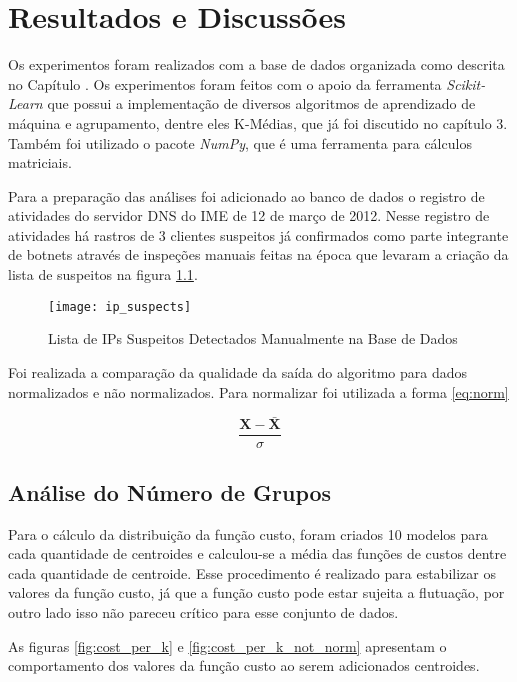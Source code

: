 \chapter{Resultados e Discussões}\label{ch:discussion}

Os experimentos foram realizados com a base de dados organizada como descrita no Capítulo \label{ch:data_preparation}. Os experimentos foram feitos com o apoio da ferramenta \textit{Scikit-Learn} que possui a implementação de diversos algoritmos de aprendizado de máquina e agrupamento, dentre eles K-Médias, que já foi discutido no capítulo 3. Também foi utilizado o pacote \textit{NumPy}, que é uma ferramenta para cálculos matriciais.

Para a preparação das análises foi adicionado ao banco de dados o registro de atividades do servidor DNS do IME de 12 de março de 2012. Nesse registro de atividades há rastros de 3 clientes suspeitos já confirmados como parte integrante de botnets através de inspeções manuais feitas na época que levaram a criação da lista de suspeitos na figura \ref{fig:suspects}.

\begin{figure}[htbp]
\centering
\texttt{[image: ip\_suspects]}
\caption[Lista de IPs Suspeitos Detectados Manualmente na Base de Dados]{Lista de IPs Suspeitos Detectados Manualmente na Base de Dados} \label{fig:suspects}
\end{figure}

Foi realizada a comparação da qualidade da saída do algoritmo para dados normalizados e não normalizados. Para normalizar foi utilizada a forma \ref{eq:norm}

\begin{equation} \label{eq:norm}
\frac{\mathbf{X} - \mathbf{\bar{X}}}{\sigma}
\end{equation}

\section{Análise do Número de Grupos}

Para o cálculo da distribuição da função custo, foram criados 10 modelos para cada quantidade de centroides e calculou-se a média das funções de custos dentre cada quantidade de centroide. Esse procedimento é realizado para estabilizar os valores da função custo, já que a função custo pode estar sujeita a flutuação, por outro lado isso não pareceu crítico para esse conjunto de dados.

As figuras \ref{fig:cost_per_k} e \ref{fig:cost_per_k_not_norm} apresentam o comportamento dos valores da função custo ao serem adicionados centroides.


